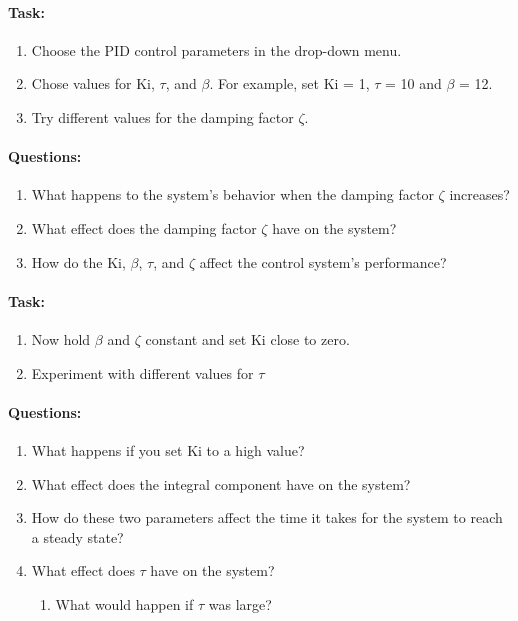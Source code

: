 \paragraph{Task:}
\begin{enumerate}[]
	\item Choose the PID control parameters in the drop-down menu.
	\item Chose values for Ki, $\tau$, and $\beta$. For example, set Ki = 1, $\tau$ = 10 and $\beta$ = 12.
	\item Try different values for the damping factor $\zeta$.
\end{enumerate}
\paragraph{Questions:}
\begin{enumerate}[]
	\item What happens to the system’s behavior when the damping factor $\zeta$ increases?
	\item What effect does the damping factor $\zeta$ have on the system?
	\item How do the Ki, $\beta$, $\tau$, and $\zeta$ affect the control system’s performance?
\end{enumerate}
\paragraph{Task:}
\begin{enumerate}[]
	\item Now hold $\beta$ and $\zeta$ constant and set Ki close to zero.
	\item Experiment with different values for $\tau$
\end{enumerate}
\paragraph{Questions:}
\begin{enumerate}[]
	\item What happens if you set Ki to a high value?
	\item What effect does the integral component have on the system?
	\item How do these two parameters affect the time it takes for the system to reach a steady state?
	\item What effect does $\tau$ have on the system?
	\begin{enumerate}[]
		\item What would happen if $\tau$ was large?
	\end{enumerate}
\end{enumerate}

